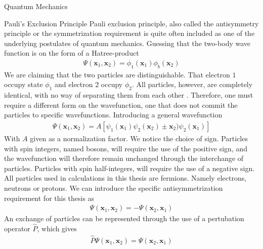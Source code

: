 \documentclass[twoside,english]{uiofysmaster}
\begin{document}
\begin{chapter}{Quantum Mechanics}
 	\begin{section}{Pauli's Exclusion Principle}
 		Pauli exclusion principle, also called the antisymmetry principle or the symmetrization requirement \cite{Szabo,Griffiths} is quite often included as one of the underlying postulates of quantum mechanics. Guessing that the two-body wave function is on the form of a Hatree-product
 		\begin{align}
 			\Psi(\mathbf{x}_1,\mathbf{x}_2) = \phi_1({\mathbf{x}_1}) \phi_b(\mathbf{x}_2)
 		\end{align}
 		We are claiming that the two particles are distinguishable. That electron $1$ occupy state $\phi_1$ and electron $2$ occupy $\phi_2$. All particles, however, are completely identical, with no way of separating them from each other \cite{Griffiths}. Therefore, one must require a different form on the wavefunction, one that does not commit the particles to specific wavefunctions. Introducing a general wavefunction
 		\begin{align}
 			\Psi(\mathbf{x}_1,\mathbf{x}_2) = A[\psi_1(\mathbf{x}_1) \psi_2(\mathbf{x}_2) \pm \mathbf{x}_2) \psi_2(\mathbf{x}_1)]
 		\end{align}
 		With $A$ given as a normalization factor. We notice the choice of sign. Particles with spin integers, named bosons, will require the use of the positive sign, and the wavefunction will therefore remain unchanged through the interchange of particles. Particles with spin half-integers, will require the use of a negative sign. All particles used in calculations in this thesis are fermions. Namely electrons, neutrons or protons. We can introduce the specific antisymmetrization requirement for this thesis as
 		\begin{align}
 			\Psi(\mathbf{x}_1,\mathbf{x}_2) = -\Psi(\mathbf{x}_2,\mathbf{x}_1)
 		\end{align}
 		An exchange of particles can be represented through the use of a pertubation operator $\hat P$, which gives 
 		\begin{align}
 			\hat P \Psi(\mathbf{x}_1,\mathbf{x}_2) = \Psi(\mathbf{x}_2,\mathbf{x}_1)
 		\end{align}
 	\end{section}


\end{chapter}
\end{document}
